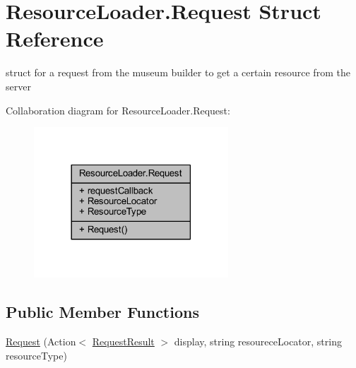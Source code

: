 \hypertarget{struct_resource_loader_1_1_request}{}\section{Resource\+Loader.\+Request Struct Reference}
\label{struct_resource_loader_1_1_request}


struct for a request from the museum builder to get a certain resource from the server  




Collaboration diagram for Resource\+Loader.\+Request\+:
\nopagebreak
\begin{figure}[H]
\begin{center}
\leavevmode
\includegraphics[width=206pt]{struct_resource_loader_1_1_request__coll__graph}
\end{center}
\end{figure}
\subsection*{Public Member Functions}
\begin{DoxyCompactItemize}
\item 
\mbox{\hyperlink{struct_resource_loader_1_1_request_a0eed476349c6e00847f857b251696bb5}{Request}} (Action$<$ \mbox{\hyperlink{struct_resource_loader_1_1_request_result}{Request\+Result}} $>$ display, string resourece\+Locator, string resource\+Type)
\end{DoxyCompactItemize}
